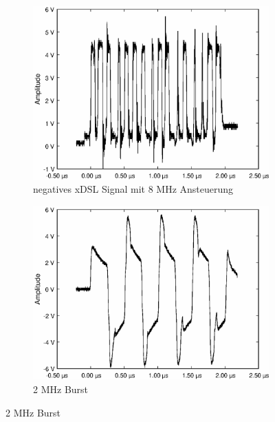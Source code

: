 \begin{figure}[h!]
\begin{subfigure}[t]{0.31\textwidth}
	    \label{fig:tx4s}
    \end{subfigure}
    \hfil %
    \begin{subfigure}[t]{0.31\textwidth}
    	\includegraphics[width=\textwidth, trim= 0mm 0mm 0mm 0mm, clip=true]{images/tests/tx/8MHz-TX.eps}%
    	\caption{negatives xDSL Signal mit 8 MHz Ansteuerung}
	    \label{fig:tx8s}
    \end{subfigure}
    \hfil
    \begin{subfigure}[t]{0.31\textwidth}
    \centering
    	\includegraphics[width=\textwidth, trim= 0mm 0mm 0mm 0mm, clip=true]{images/tests/tx/2MHz-in.eps}%
    	\caption{2 MHz Burst}

\end{subfigure}
\end{figure}
